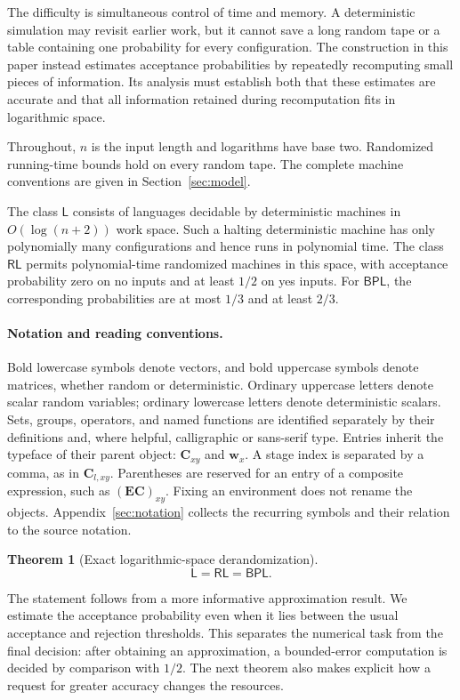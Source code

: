 \documentclass[11pt]{article}
\numberwithin{equation}{section}
\newtheorem{theorem}{Theorem}[section]
\theoremstyle{definition}
\theoremstyle{remark}
\newcommand{\RL}{\mathsf{RL}}
\newcommand{\Lclass}{\mathsf L}
\newcommand{\BPL}{\mathsf{BPL}}
\begin{document}
The difficulty is simultaneous control of time and memory. A deterministic simulation may revisit earlier work, but it cannot save a long random tape or a table containing one probability for every configuration. The construction in this paper instead estimates acceptance probabilities by repeatedly recomputing small pieces of information. Its analysis must establish both that these estimates are accurate and that all information retained during recomputation fits in logarithmic space.

Throughout, $n$ is the input length and logarithms have base two. Randomized running-time bounds hold on every random tape. The complete machine conventions are given in Section~\ref{sec:model}.

The class $\Lclass$ consists of languages decidable by deterministic
machines in $O(\log(n+2))$ work space. Such a halting deterministic
machine has only polynomially many configurations and hence runs in
polynomial time. The class $\RL$ permits
polynomial-time randomized machines in this space, with acceptance
probability zero on no inputs and at least $1/2$ on yes inputs.
For $\BPL$, the corresponding probabilities are at most $1/3$ and at
least $2/3$.

\paragraph{Notation and reading conventions.}
Bold lowercase symbols denote vectors, and bold uppercase symbols denote matrices, whether random or deterministic. Ordinary uppercase letters denote scalar random variables; ordinary lowercase letters denote deterministic scalars. Sets, groups, operators, and named functions are identified separately by their definitions and, where helpful, calligraphic or sans-serif type. Entries inherit the typeface of their parent object: $\mathbf C_{xy}$ and $\mathbf w_x$. A stage index is separated by a comma, as in $\mathbf C_{l,xy}$. Parentheses are reserved for an entry of a composite expression, such as $(\mathbf E\mathbf C)_{xy}$. Fixing an environment does not rename the objects. Appendix~\ref{sec:notation} collects the recurring symbols and their relation to the source notation.

\begin{theorem}[Exact logarithmic-space derandomization]\label{thm:main}
\[
                 \Lclass=\RL=\BPL.
\]
\end{theorem}

The statement follows from a more informative approximation result. We estimate the acceptance probability even when it lies between the usual acceptance and rejection thresholds. This separates the numerical task from the final decision: after obtaining an approximation, a bounded-error computation is decided by comparison with $1/2$. The next theorem also makes explicit how a request for greater accuracy changes the resources.
\end{document}
